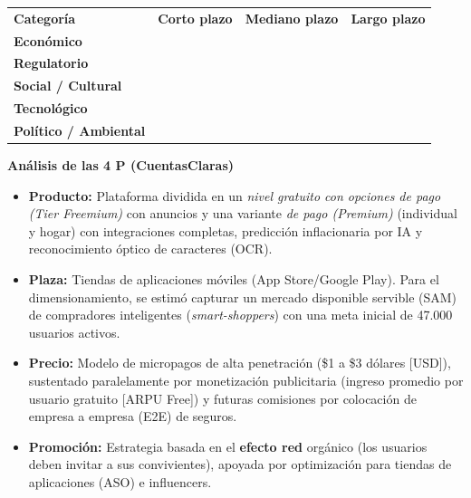 \newpage

\begin{table}[h!]
\centering
\renewcommand{\arraystretch}{1.5}
\begin{tabularx}{\textwidth}{|l|X|X|X|}
\hline
\rowcolor{red!20} \multicolumn{4}{|c|}{\textbf{CONTEXTO}} \\ \hline
\rowcolor{red!10} \textbf{Categoría} & \textbf{Corto plazo} & \textbf{Mediano plazo} & \textbf{Largo plazo} \\ \hline
\textbf{Económico} & \cellcolor{green!50} & \cellcolor{orange!50} & \cellcolor{green!50} \\ \hline
\textbf{Regulatorio} & \cellcolor{green!50} & \cellcolor{green!50} & \cellcolor{green!50} \\ \hline
\textbf{Social / Cultural} & \cellcolor{orange!50} & \cellcolor{green!50} & \cellcolor{green!50} \\ \hline
\textbf{Tecnológico} & \cellcolor{green!50} & \cellcolor{green!50} & \cellcolor{green!50} \\ \hline
\textbf{Político / Ambiental} & \cellcolor{green!50} & \cellcolor{orange!50} & \cellcolor{green!50} \\ \hline
\end{tabularx}
\end{table}

\textbf{Análisis de las 4 P (CuentasClaras)}

\begin{itemize}
    \item \textbf{Producto:} Plataforma dividida en un \textit{nivel gratuito con opciones de pago (Tier Freemium)} con anuncios y una variante \textit{de pago (Premium)} (individual y hogar) con integraciones completas, predicción inflacionaria por IA y reconocimiento óptico de caracteres (OCR).
    \item \textbf{Plaza:} Tiendas de aplicaciones móviles (App Store/Google Play). Para el dimensionamiento, se estimó capturar un mercado disponible servible (SAM) de compradores inteligentes (\textit{smart-shoppers}) con una meta inicial de 47.000 usuarios activos.
    \item \textbf{Precio:} Modelo de micropagos de alta penetración (\$1 a \$3 dólares [USD]), sustentado paralelamente por monetización publicitaria (ingreso promedio por usuario gratuito [ARPU Free]) y futuras comisiones por colocación de empresa a empresa (E2E) de seguros.
    \item \textbf{Promoción:} Estrategia basada en el \textbf{efecto red} orgánico (los usuarios deben invitar a sus convivientes), apoyada por optimización para tiendas de aplicaciones (ASO) e influencers.
\end{itemize}

